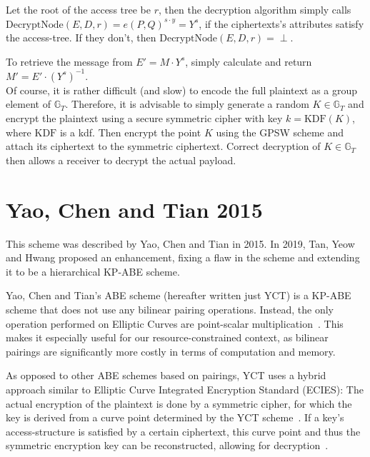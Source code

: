 Let the root of the access tree be $r$, then the decryption algorithm simply calls $\text{DecryptNode}(E, D, r) = e(P,Q)^{s \cdot y} = Y^s$, if the ciphertexts's attributes satisfy the \gls{access-tree}.
If they don't, then $\text{DecryptNode}(E, D, r) = \perp$.

To retrieve the message from $E' = M \cdot Y^s$, simply calculate and return $M' = E' \cdot (Y^s)^{-1}$.\\

Of course, it is rather difficult (and slow) to encode the full plaintext as a group element of $\mathbb{G}_T$.
Therefore, it is advisable to simply generate a random $K \in \mathbb{G}_T$ and encrypt the plaintext using a secure symmetric cipher with key $k = \text{KDF}(K)$, where $\text{KDF}$ is a \gls{kdf}.
Then encrypt the point $K$ using the GPSW scheme and attach its ciphertext to the symmetric ciphertext.
Correct decryption of $K \in \mathbb{G}_T$ then allows a receiver to decrypt the actual payload.

\section{Yao, Chen and Tian 2015}

This scheme was described by Yao, Chen and Tian \cite{yao_lightweight_2015} in 2015.
In 2019, Tan, Yeow and Hwang \cite{tan_enhancement_2019} proposed an enhancement, fixing a flaw in the scheme and extending it to be a hierarchical KP-ABE scheme. %

Yao, Chen and Tian's ABE scheme (hereafter written just YCT) is a KP-ABE scheme that does not use any bilinear pairing operations.
Instead, the only operation performed on Elliptic Curves are point-scalar multiplication~\cite{yao_lightweight_2015}.
This makes it especially useful for our resource-constrained context, as bilinear pairings are significantly more costly in terms of computation and memory.

As opposed to other ABE schemes based on pairings, YCT uses a hybrid approach similar to Elliptic Curve Integrated Encryption Standard (ECIES):
The actual encryption of the plaintext is done by a symmetric cipher, for which the key is derived from a curve point determined by the YCT scheme~\cite{yao_lightweight_2015}.
If a key's \gls{access-structure} is satisfied by a certain ciphertext, this curve point and thus the symmetric encryption key can be reconstructed, allowing for decryption~\cite{yao_lightweight_2015}.


